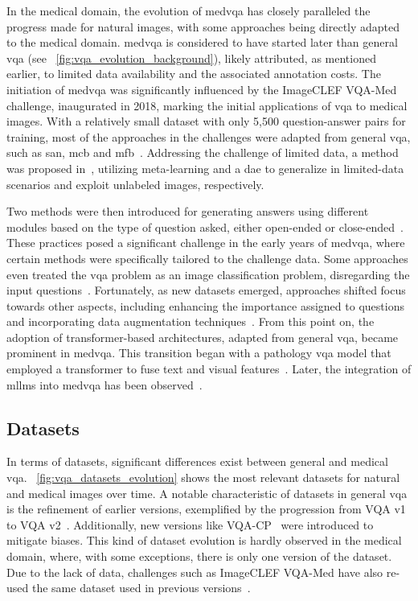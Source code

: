 In the medical domain, the evolution of \gls{medvqa} has closely paralleled the progress made for natural images, with some approaches being directly adapted to the medical domain. \gls{medvqa} is considered to have started later than general \gls{vqa} (see \fig~\ref{fig:vqa_evolution_background}), likely attributed, as mentioned earlier, to limited data availability and the associated annotation costs. The initiation of \gls{medvqa} was significantly influenced by the ImageCLEF VQA-Med challenge, inaugurated in 2018, marking the initial applications of \gls{vqa} to medical images. With a relatively small dataset with only 5,500 question-answer pairs for training, most of the approaches in the challenges were adapted from general \gls{vqa}, such as \gls{san}, \gls{mcb} and \gls{mfb}~\cite{ImageCLEFVQA_Med2018}. Addressing the challenge of limited data, a method was proposed in~\cite{nguyen2019overcoming}, utilizing meta-learning and a \gls{dae} to generalize in limited-data scenarios and exploit unlabeled images, respectively.

Two methods were then introduced for generating answers using different modules based on the type of question asked, either open-ended or close-ended~\cite{zhan2020medical,gupta2021hierarchical}. These practices posed a significant challenge in the early years of \gls{medvqa}, where certain methods were specifically tailored to the challenge data. Some approaches even treated the \gls{vqa} problem as an image classification problem, disregarding the input questions~\cite{al2020inception}. Fortunately, as new datasets emerged, approaches shifted focus towards other aspects, including enhancing the importance assigned to questions~\cite{vu2020question} and incorporating data augmentation techniques~\cite{gong2021cross}. From this point on, the adoption of transformer-based architectures, adapted from general \gls{vqa}, became prominent in \gls{medvqa}. This transition began with a pathology \gls{vqa} model that employed a transformer to fuse text and visual features~\cite{naseem2022vision}. Later, the integration of \glspl{mllm} into \gls{medvqa} has been observed~\cite{vansonsbeek2023openended,seenivasan2023surgicalgpt,he2024pefomed}.

\subsection{Datasets}
\label{sec:vqa_datasets}

In terms of datasets, significant differences exist between general and medical \gls{vqa}. \fig~\ref{fig:vqa_datasets_evolution} shows the most relevant datasets for natural and medical images over time. A notable characteristic of datasets in general \gls{vqa} is the refinement of earlier versions, exemplified by the progression from VQA v1~\cite{antol2015vqa} to VQA v2~\cite{goyal2017making}. Additionally, new versions like VQA-CP~\cite{agrawal2018don} were introduced to mitigate biases. This kind of dataset evolution is hardly observed in the medical domain, where, with some exceptions, there is only one version of the dataset. Due to the lack of data, challenges such as ImageCLEF VQA-Med have also re-used the same dataset used in previous versions~\cite{ImageCLEF-VQA-Med2021}.

